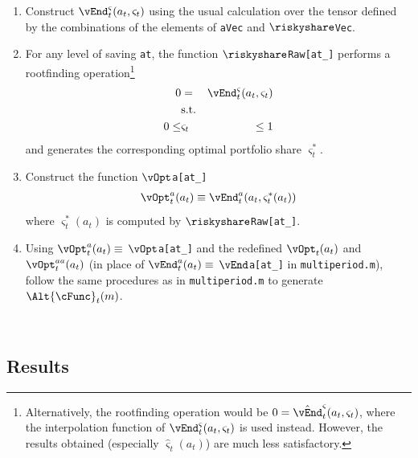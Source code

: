 \documentclass[titlepage]{\econtex}
\begin{document}
\begin{enumerate}

\item Construct
  $\vEnd_{t}^{\varsigma}({a}_{t},\varsigma_{t})$ using the usual calculation
  over the tensor defined by the combinations of the elements of
  \texttt{aVec} and \texttt{$\riskyshare$Vec}.

\item For any level of saving \texttt{at}, the function \texttt{$\riskyshare$Raw[at\_]} performs a rootfinding
  operation\footnote{Alternatively, the rootfinding operation would be
    $0 = \hat{\vEnd}^{\varsigma}_{t}({a}_{t},\varsigma_{t})$, where the
    interpolation function of $\vEnd_{t}^{\varsigma}({a}_{t},\varsigma_{t})$ is
    used instead. However, the results obtained (especially
    $\hat{\varsigma}_{t}({a}_{t})$) are much less satisfactory.}
  \begin{eqnarray}
    0 & = & \vEnd^{\varsigma}_{t}({a}_{t},\varsigma_{t})
    \\      & \text{s.t.} & \nonumber
    \\      0 \leq & \varsigma_{t} & \leq 1
  \end{eqnarray}
  and generates the corresponding optimal portfolio share
  $\varsigma^{\ast}_{t}$.

\item Construct the function \texttt{$\vOpt$a[at\_]}
  \begin{eqnarray}
    \vOpt_{t}^{a}({a}_{t}) \equiv
    \vEnd_{t}^{a}({a}_{t},\varsigma^{\ast}_{t}({a}_{t}))
  \end{eqnarray}
  where $\varsigma^{\ast}_{t}({a}_{t})$ is computed by \texttt{$\riskyshare$Raw[at\_]}.

\item Using $\vOpt_{t}^{a}({a}_{t}) \equiv$
  \texttt{$\vOpt$a[at\_]} and the redefined
  $\vOpt_{t}({a}_{t})$ and $\vOpt_{t}^{{aa}}({a}_{t})$ (in
  place of $\vEnd_{t}^{a}({a}_{t}) \equiv $ \texttt{$\vEnd$a[at\_]} in
  \texttt{multiperiod.m}), follow the same procedures as in
  \texttt{multiperiod.m} to generate $\Alt{\cFunc}_{t}({m})$.

\end{enumerate}

\
\subsection{Results}
\end{document}
